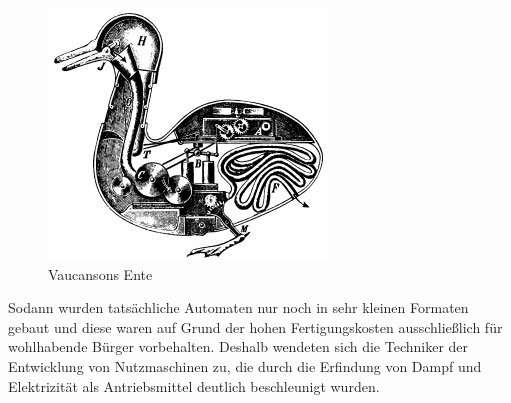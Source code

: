\begin{figure}[H]						
	\centering							
	\includegraphics[scale=0.9]{Bilder/Duck_of_Vaucanson.jpg}			
	\caption{Vaucansons Ente}						
	\label{f:Ente}						
\end{figure}
Sodann wurden tatsächliche Automaten nur noch in sehr kleinen Formaten gebaut und diese waren auf Grund der hohen Fertigungskosten ausschließlich für wohlhabende Bürger vorbehalten. Deshalb wendeten sich die Techniker der Entwicklung von Nutzmaschinen zu, die durch die Erfindung von Dampf und Elektrizität als Antriebsmittel deutlich beschleunigt wurden. 

